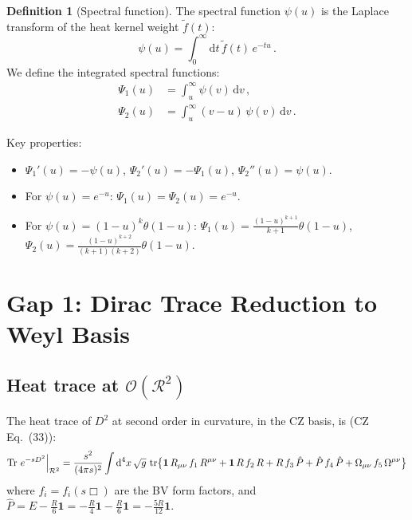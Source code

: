 \documentclass[11pt,a4paper]{article}
\newcommand{\Id}{\mathbf{1}}
\renewcommand{\dd}{\mathrm{d}}
\theoremstyle{definition}
\newtheorem{definition}[theorem]{Definition}
\theoremstyle{remark}
\begin{document}
\begin{definition}[Spectral function]
The spectral function $\psi(u)$ is the Laplace transform of the
heat kernel weight $\tilde{f}(t)$:
\begin{equation}
  \psi(u) = \int_0^\infty \dd t\,\tilde{f}(t)\,e^{-tu}\,.
  \label{eq:psi-def}
\end{equation}
We define the integrated spectral functions:
\begin{equation}
  \boxed{
  \begin{aligned}
  \Psi_1(u) &= \int_u^\infty \psi(v)\,\dd v\,,\\[4pt]
  \Psi_2(u) &= \int_u^\infty (v-u)\,\psi(v)\,\dd v\,.
  \end{aligned}
  }
  \label{eq:Psi-def}
\end{equation}
\end{definition}

Key properties:
\begin{itemize}
\item $\Psi_1'(u) = -\psi(u)$, \quad $\Psi_2'(u) = -\Psi_1(u)$,
  \quad $\Psi_2''(u) = \psi(u)$.
\item For $\psi(u) = e^{-u}$: \;
  $\Psi_1(u) = \Psi_2(u) = e^{-u}$.
\item For $\psi(u) = (1-u)^k\theta(1-u)$: \;
  $\Psi_1(u) = \frac{(1-u)^{k+1}}{k+1}\theta(1-u)$, \;
  $\Psi_2(u) = \frac{(1-u)^{k+2}}{(k+1)(k+2)}\theta(1-u)$.
\end{itemize}


\newpage
\section{Gap 1: Dirac Trace Reduction to Weyl Basis}
\label{sec:gap1}

\subsection{Heat trace at $\mathcal{O}(\mathcal{R}^2)$}

The heat trace of $D^2$ at second order in curvature, in the CZ
basis, is (CZ Eq.~(33)):
\begin{equation}
  \Tr\,e^{-sD^2}\Big|_{\mathcal{R}^2}
  = \frac{s^2}{(4\pi s)^2}\int\dd^4x\,\sqrt{g}\,\tr\bigl\{
  \Id\,R_{\mu\nu}\,f_1\,R^{\mu\nu}
  + \Id\,R\,f_2\,R
  + R\,f_3\,\hat{P}
  + \hat{P}\,f_4\,\hat{P}
  + \Omega_{\mu\nu}\,f_5\,\Omega^{\mu\nu}
  \bigr\}
  \label{eq:heat-trace-BV}
\end{equation}
where $f_i = f_i(s\Box)$ are the BV form factors, and
$\hat{P} = E - \frac{R}{6}\Id = -\frac{R}{4}\Id - \frac{R}{6}\Id
= -\frac{5R}{12}\Id$.
\end{document}
